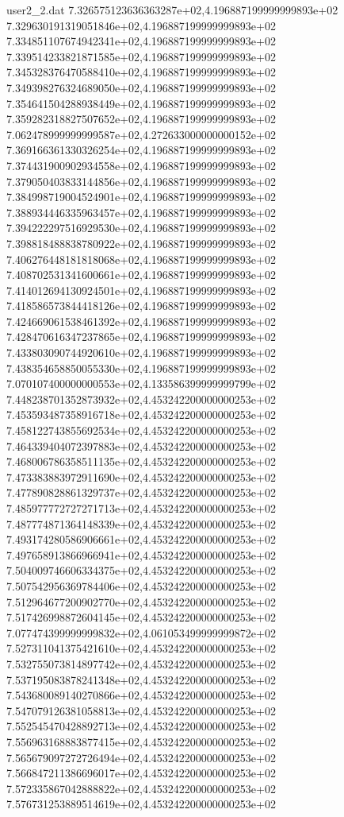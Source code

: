 \begin{filecontents}{user2_2.dat}
7.326575123636363287e+02,4.196887199999999893e+02
7.329630191319051846e+02,4.196887199999999893e+02
7.334851107674942341e+02,4.196887199999999893e+02
7.339514233821871585e+02,4.196887199999999893e+02
7.345328376470588410e+02,4.196887199999999893e+02
7.349398276324689050e+02,4.196887199999999893e+02
7.354641504288938449e+02,4.196887199999999893e+02
7.359282318827507652e+02,4.196887199999999893e+02
7.062478999999999587e+02,4.272633000000000152e+02
7.369166361330326254e+02,4.196887199999999893e+02
7.374431900902934558e+02,4.196887199999999893e+02
7.379050403833144856e+02,4.196887199999999893e+02
7.384998719004524901e+02,4.196887199999999893e+02
7.388934446335963457e+02,4.196887199999999893e+02
7.394222297516929530e+02,4.196887199999999893e+02
7.398818488838780922e+02,4.196887199999999893e+02
7.406276448181818068e+02,4.196887199999999893e+02
7.408702531341600661e+02,4.196887199999999893e+02
7.414012694130924501e+02,4.196887199999999893e+02
7.418586573844418126e+02,4.196887199999999893e+02
7.424669061538461392e+02,4.196887199999999893e+02
7.428470616347237865e+02,4.196887199999999893e+02
7.433803090744920610e+02,4.196887199999999893e+02
7.438354658850055330e+02,4.196887199999999893e+02
7.070107400000000553e+02,4.133586399999999799e+02
7.448238701352873932e+02,4.453242200000000253e+02
7.453593487358916718e+02,4.453242200000000253e+02
7.458122743855692534e+02,4.453242200000000253e+02
7.464339404072397883e+02,4.453242200000000253e+02
7.468006786358511135e+02,4.453242200000000253e+02
7.473383883972911690e+02,4.453242200000000253e+02
7.477890828861329737e+02,4.453242200000000253e+02
7.485977772727271713e+02,4.453242200000000253e+02
7.487774871364148339e+02,4.453242200000000253e+02
7.493174280586906661e+02,4.453242200000000253e+02
7.497658913866966941e+02,4.453242200000000253e+02
7.504009746606334375e+02,4.453242200000000253e+02
7.507542956369784406e+02,4.453242200000000253e+02
7.512964677200902770e+02,4.453242200000000253e+02
7.517426998872604145e+02,4.453242200000000253e+02
7.077474399999999832e+02,4.061053499999999872e+02
7.527311041375421610e+02,4.453242200000000253e+02
7.532755073814897742e+02,4.453242200000000253e+02
7.537195083878241348e+02,4.453242200000000253e+02
7.543680089140270866e+02,4.453242200000000253e+02
7.547079126381058813e+02,4.453242200000000253e+02
7.552545470428892713e+02,4.453242200000000253e+02
7.556963168883877415e+02,4.453242200000000253e+02
7.565679097272726494e+02,4.453242200000000253e+02
7.566847211386696017e+02,4.453242200000000253e+02
7.572335867042888822e+02,4.453242200000000253e+02
7.576731253889514619e+02,4.453242200000000253e+02

\end{filecontents}
